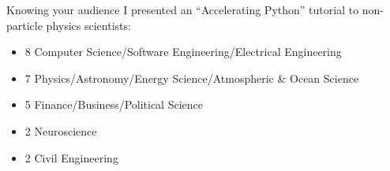 \documentclass[aspectratio=169]{beamer}
\begin{document}
\begin{frame}{Knowing your audience}
\vspace{0.5 cm}
{\large I presented an ``Accelerating Python'' tutorial to non-particle physics scientists:}

\small
\begin{itemize}\setlength{\itemsep}{-0.1 cm}
\item 8 Computer Science/Software Engineering/Electrical Engineering
\item 7 Physics/Astronomy/Energy Science/Atmospheric \& Ocean Science
\item 5 Finance/Business/Political Science
\item 2 Neuroscience
\item 2 Civil Engineering
\end{itemize}

\large
\vspace{0.5 cm}

\vspace{0.5 cm}
\end{frame}
\end{document}
